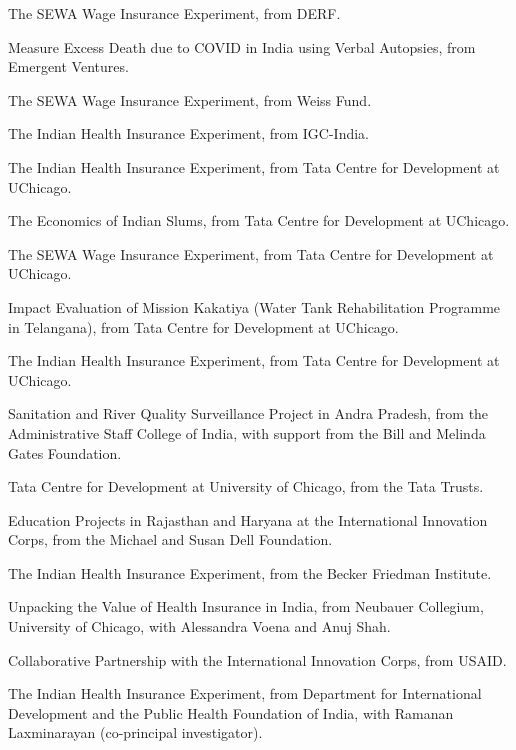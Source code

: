 \documentclass[11pt,letterpaper]{report}
\begin{document}
    \begin{tablist}

        \item[2024] \tab{}The SEWA Wage Insurance Experiment, from DERF.
        \item[2022] \tab{}Measure Excess Death due to COVID in India using Verbal Autopsies, from Emergent Ventures.
        \item[2022] \tab{}The SEWA Wage Insurance Experiment, from Weiss Fund.
        \item[2019] \tab{}The Indian Health Insurance Experiment, from IGC-India.
        \item[2019] \tab{}The Indian Health Insurance Experiment, from Tata Centre for Development at UChicago.
        \item[2017] \tab{}The Economics of Indian Slums, from Tata Centre for Development at UChicago.
        \item[2017] \tab{}The SEWA Wage Insurance Experiment, from Tata Centre for Development at UChicago.
        \item[2016] \tab{}Impact Evaluation of Mission Kakatiya (Water Tank Rehabilitation Programme in Telangana), from Tata Centre for Development at UChicago.
        \item[2016] \tab{}The Indian Health Insurance Experiment, from Tata Centre for Development at UChicago.
        \item[2016--18] \tab{}Sanitation and River Quality Surveillance Project in Andra Pradesh, from the Administrative Staff College of India, with support from the Bill and Melinda Gates Foundation.  
        \item[2016] \tab{}Tata Centre for Development at University of Chicago, from the Tata Trusts.
        \item[2015-17] \tab{}Education Projects in Rajasthan and Haryana at the International Innovation Corps, from the Michael and Susan Dell Foundation.
        \item[2015] \tab{}The Indian Health Insurance Experiment, from the Becker Friedman Institute.
        \item[2014--15] \tab{}Unpacking the Value of Health Insurance in India, from Neubauer Collegium, University of Chicago, with Alessandra Voena and Anuj Shah.
        \item[2013] \tab{}Collaborative Partnership with the International Innovation Corps, from USAID.
        \item[2013--14] \tab{}The Indian Health Insurance Experiment, from Department for International Development and the Public Health Foundation of India, with Ramanan Laxminarayan (co-principal investigator).

\end{tablist}
\end{document}
